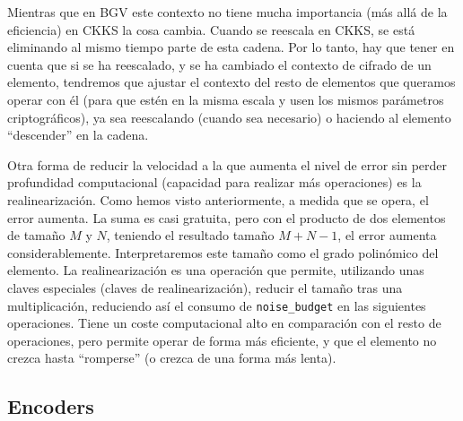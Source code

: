 Mientras que en BGV este contexto no tiene mucha importancia (más allá de la eficiencia) en CKKS la cosa cambia. Cuando se reescala en CKKS, se está eliminando al mismo tiempo parte de esta cadena. Por lo tanto, hay que tener en cuenta que si se ha reescalado, y se ha cambiado el contexto de cifrado de un elemento, tendremos que ajustar el contexto del resto de elementos que queramos operar con él (para que estén en la misma escala y usen los mismos parámetros criptográficos), ya sea reescalando (cuando sea necesario) o haciendo al elemento ``descender'' en la cadena.

Otra forma de reducir la velocidad a la que aumenta el nivel de error sin perder profundidad computacional (capacidad para realizar más operaciones) es la realinearización. Como hemos visto anteriormente, a medida que se opera, el error aumenta. La suma es casi gratuita, pero con el producto de dos elementos de tamaño $M$ y $N$, teniendo el resultado tamaño $M+N-1$, el error aumenta considerablemente. Interpretaremos este tamaño como el grado polinómico del elemento. La realinearización es una operación que permite, utilizando unas claves especiales (claves de realinearización), reducir el tamaño tras una multiplicación, reduciendo así el consumo de \verb|noise_budget| en las siguientes operaciones. Tiene un coste computacional alto en comparación con el resto de operaciones, pero permite operar de forma más eficiente, y que el elemento no crezca hasta ``romperse'' (o crezca de una forma más lenta).

\subsection{Encoders}

